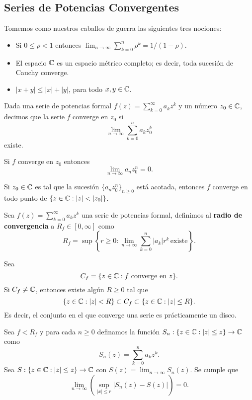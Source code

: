 \subsection{Series de Potencias Convergentes}

Tomemos como nuestros caballos de guerra las siguientes tres nociones:
\begin{itemize}
  \item Si $0 \leq \rho < 1$ entonces $\lim_{n \to \infty} \sum_{k = 0}^n \rho^k = 1 / (1 - \rho)$.
  \item El espacio $\mathbb C$ es un espacio m\'etrico completo; es decir, toda sucesi\'on de Cauchy converge.
  \item $|x + y| \leq |x| + |y|$, para todo $x, y \in \mathbb C$.
\end{itemize}

Dada una serie de potencias formal $f(z) = \sum_{k = 0}^{\infty} a_k z^k$ y un n\'umero $z_0 \in \mathbb C$,
decimos que la serie $f$ converge en $z_0$ si
\[
  \lim_{n \to \infty} \sum_{k = 0}^n a_k z_0^k
\]
existe.

\begin{theorem}
  Si $f$ converge en $z_0$ entonces
  \[
    \lim_{n \to \infty} a_n z_0^n = 0.  
  \]
\end{theorem}

\begin{theorem}
  Si $z_0 \in \mathbb C$ es tal que la sucesi\'on $\{a_n z_0^n\}_{n \geq 0}$ est\'a acotada, entonces
  $f$ converge en todo punto de $\{z \in \mathbb C : |z| < |z_0|\}$.
\end{theorem}

\begin{defn}
  Sea $f(z) = \sum_{k = 0}^{\infty} a_k z^k$ una serie de potencias formal, definimos al
  \textbf{radio de convergencia} a $R_f \in [0, \infty]$ como
  \[
    R_f = \sup\left\{r \geq 0 : \lim_{n \to \infty}\sum_{k = 0}^n |a_k| r^k\, \text{existe}\right\}.
  \]
\end{defn}

\begin{theorem}
  Sea
  \[
    C_f = \{z \in \mathbb C : f \text{ converge en } z\}.
  \]
  Si $C_f \neq \mathbb C$, entonces existe alg\'un $R \geq 0$ tal que
  \[
    \{z \in \mathbb C : |z| < R\} \subset C_f \subset \{z \in \mathbb C : |z| \leq R\}.
  \]
  Es decir, el conjunto en el que converge una serie es pr\'acticamente un disco.
\end{theorem}

\begin{theorem}
  Sea $f < R_f$ y para cada $n \geq 0$ definamos la funci\'on
  $S_n: \{z \in \mathbb C : |z| \leq z\} \to \mathbb C$ como
  \[
    S_n(z) = \sum_{k = 0}^n a_k z^k.  
  \]
  Sea $S: \{z \in \mathbb C : |z| \leq z\} \to \mathbb C$ con $S(z) = \lim_{n \to \infty} S_n(z)$.
  Se cumple que
  \[
    \lim_{n \to \infty} \left(\sup_{|x| \leq r} |S_n(z) - S(z)|\right) = 0.
  \]
\end{theorem}

